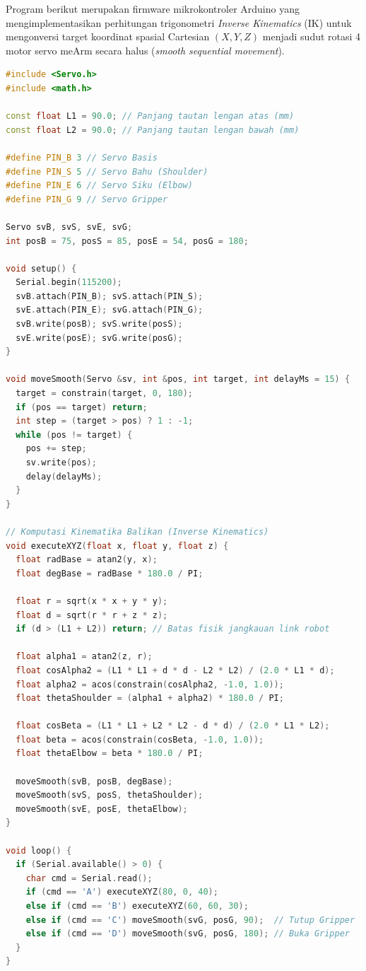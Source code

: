 Program berikut merupakan firmware mikrokontroler Arduino yang mengimplementasikan perhitungan trigonometri \textit{Inverse Kinematics} (IK) untuk mengonversi target koordinat spasial Cartesian $(X,Y,Z)$ menjadi sudut rotasi 4 motor servo meArm secara halus (\textit{smooth sequential movement}).

\begin{lstlisting}[language=C++, caption={Implementasi Program Arduino Kinematika Balikan meArm 4-DOF}]
#include <Servo.h>
#include <math.h>

const float L1 = 90.0; // Panjang tautan lengan atas (mm)
const float L2 = 90.0; // Panjang tautan lengan bawah (mm)

#define PIN_B 3 // Servo Basis
#define PIN_S 5 // Servo Bahu (Shoulder)
#define PIN_E 6 // Servo Siku (Elbow)
#define PIN_G 9 // Servo Gripper

Servo svB, svS, svE, svG;
int posB = 75, posS = 85, posE = 54, posG = 180;

void setup() {
  Serial.begin(115200);
  svB.attach(PIN_B); svS.attach(PIN_S);
  svE.attach(PIN_E); svG.attach(PIN_G);
  svB.write(posB); svS.write(posS);
  svE.write(posE); svG.write(posG);
}

void moveSmooth(Servo &sv, int &pos, int target, int delayMs = 15) {
  target = constrain(target, 0, 180);
  if (pos == target) return;
  int step = (target > pos) ? 1 : -1;
  while (pos != target) {
    pos += step;
    sv.write(pos);
    delay(delayMs);
  }
}

// Komputasi Kinematika Balikan (Inverse Kinematics)
void executeXYZ(float x, float y, float z) {
  float radBase = atan2(y, x);
  float degBase = radBase * 180.0 / PI;

  float r = sqrt(x * x + y * y);
  float d = sqrt(r * r + z * z);
  if (d > (L1 + L2)) return; // Batas fisik jangkauan link robot

  float alpha1 = atan2(z, r);
  float cosAlpha2 = (L1 * L1 + d * d - L2 * L2) / (2.0 * L1 * d);
  float alpha2 = acos(constrain(cosAlpha2, -1.0, 1.0));
  float thetaShoulder = (alpha1 + alpha2) * 180.0 / PI;

  float cosBeta = (L1 * L1 + L2 * L2 - d * d) / (2.0 * L1 * L2);
  float beta = acos(constrain(cosBeta, -1.0, 1.0));
  float thetaElbow = beta * 180.0 / PI;

  moveSmooth(svB, posB, degBase);
  moveSmooth(svS, posS, thetaShoulder);
  moveSmooth(svE, posE, thetaElbow);
}

void loop() {
  if (Serial.available() > 0) {
    char cmd = Serial.read();
    if (cmd == 'A') executeXYZ(80, 0, 40);
    else if (cmd == 'B') executeXYZ(60, 60, 30);
    else if (cmd == 'C') moveSmooth(svG, posG, 90);  // Tutup Gripper
    else if (cmd == 'D') moveSmooth(svG, posG, 180); // Buka Gripper
  }
}
\end{lstlisting}

